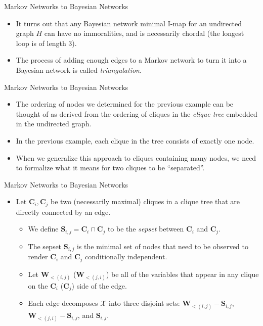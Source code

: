\documentclass[11pt]{beamer}
\begin{document}
\begin{frame}{Markov Networks to Bayesian Networks}
\setlength{\topsep}{0pt}
\setlength{\partopsep}{0pt}
\centering
\begin{figure}
\resizebox{0.6\textwidth}{!}{\markovtobayesian}
\end{figure}
\begin{itemize}
	\item It turns out that any Bayesian network minimal I-map for an
	undirected graph $H$ can have no immoralities, and is necessarily
	chordal (the longest loop is of length 3).
	\item The process of adding enough edges to a Markov network to turn it
	into a Bayesian network is called \emph{triangulation}.
\end{itemize}
\end{frame}

\begin{frame}{Markov Networks to Bayesian Networks}
\begin{itemize}
	\item The ordering of nodes we determined for the previous example can
	be thought of as derived from the ordering of cliques in the
	\emph{clique tree} embedded in the undirected graph.
	\item In the previous example, each clique in the tree consists of
	exactly one node.
	\item When we generalize this approach to cliques containing many nodes,
	we need to formalize what it means for two cliques to be ``separated''.
\end{itemize}
\end{frame}

\begin{frame}{Markov Networks to Bayesian Networks}
\begin{itemize}
	\item Let $\boldsymbol{C}_{i},\boldsymbol{C}_{j}$ be two (necessarily
	maximal) cliques in a clique tree that are directly connected by an
	edge.
	\begin{itemize}
		\item We define $\boldsymbol{S}_{i,j} = \boldsymbol{C}_{i} \cap
		\boldsymbol{C}_{j}$ to be the \emph{sepset} between
		$\boldsymbol{C}_{i}$ and $\boldsymbol{C}_{j}$.
		\item The sepset $\boldsymbol{S}_{i,j}$ is the minimal set of
		nodes that need to be observed to render $\boldsymbol{C}_{i}$
		and $\boldsymbol{C}_{j}$ conditionally independent.
		\item Let $\boldsymbol{W}_{<(i,j)}$ ($\boldsymbol{W}_{<(j,i)}$)
		be all of the variables that appear in any clique on the
		$\boldsymbol{C}_{i}$ ($\boldsymbol{C}_{j}$) side of the edge.
		\item Each edge decomposes $\mathcal{X}$ into three disjoint
		sets: $\boldsymbol{W}_{<(i,j)} - \boldsymbol{S}_{i,j}$,
		$\boldsymbol{W}_{<(j,i)} - \boldsymbol{S}_{i,j}$, and
		$\boldsymbol{S}_{i,j}$.
	\end{itemize}
\end{itemize}
\end{frame}
\end{document}
